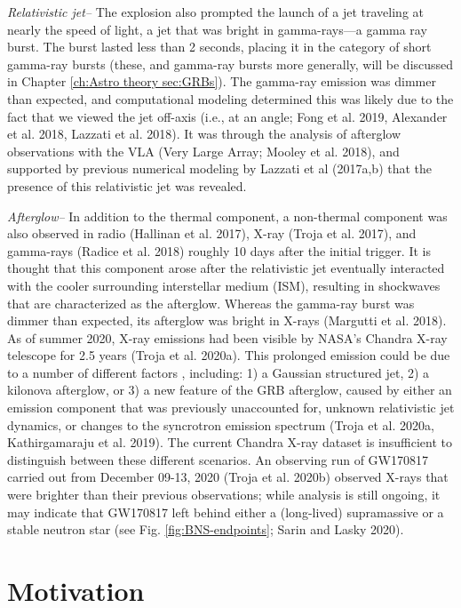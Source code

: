\documentclass[1.5,11pt]{beavtex}
\begin{document}
\textit{Relativistic jet–} The explosion also prompted the launch of a jet traveling at nearly the speed of light, a jet that was bright in gamma-rays---a gamma ray burst. The burst lasted less than 2 seconds, placing it in the category of short gamma-ray bursts (these, and gamma-ray bursts more generally, will be discussed in Chapter \ref{ch:Astro theory sec:GRBs}). The gamma-ray emission was dimmer than expected, and computational modeling determined this was likely due to the fact that we viewed the jet off-axis (i.e., at an angle; Fong et al. 2019, Alexander et al. 2018, Lazzati et al. 2018). It was through the analysis of afterglow observations with the VLA (Very Large Array; Mooley et al. 2018), and supported by previous numerical modeling by Lazzati et al (2017a,b) that the presence of this relativistic jet was revealed.  

\textit{Afterglow–} In addition to the thermal component, a non-thermal component was also observed in radio (Hallinan et al. 2017), X-ray (Troja et al. 2017), and gamma-rays (Radice et al. 2018) roughly 10 days after the initial trigger. It is thought that this component arose after the relativistic jet eventually interacted with the cooler surrounding interstellar medium (ISM), resulting in shockwaves that are characterized as the afterglow. Whereas the gamma-ray burst was dimmer than expected, its afterglow was bright in X-rays (Margutti et al. 2018). As of summer 2020, X-ray emissions had been visible by NASA's Chandra X-ray telescope for 2.5 years (Troja et al. 2020a). This prolonged emission could be due to a number of different factors , including: 1) a Gaussian structured jet, 2) a kilonova afterglow, or 3) a new feature of the GRB afterglow, caused by either an emission component that was previously unaccounted for, unknown relativistic jet dynamics, or changes to the syncrotron emission spectrum (Troja et al. 2020a, Kathirgamaraju et al. 2019). The current Chandra X-ray dataset is insufficient to distinguish between these different scenarios. An observing run of GW170817 carried out from December 09-13, 2020 (Troja et al. 2020b) observed X-rays that were brighter than their previous observations; while analysis is still ongoing, it may indicate that GW170817 left behind either a (long-lived) supramassive or a stable neutron star (see Fig. \ref{fig:BNS-endpoints}; Sarin and Lasky 2020).

\section{Motivation} \label{ch:Intro sec:Motivation}
\end{document}
